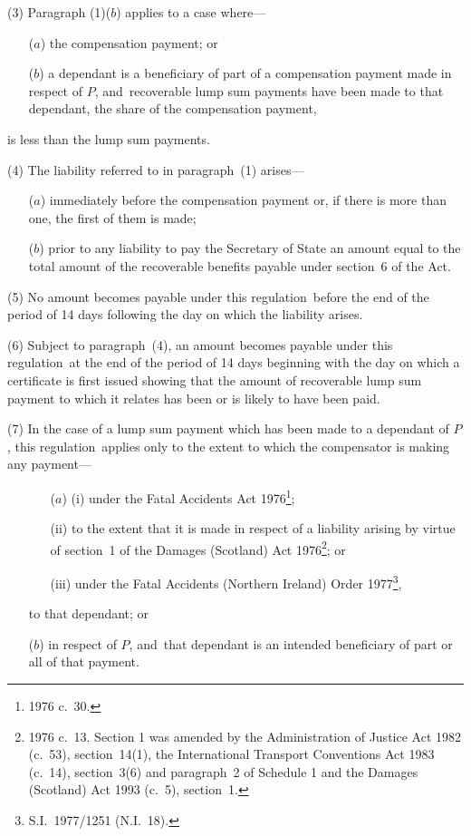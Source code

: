 \documentclass[12pt,a4paper]{article}
\begin{document}
(3) Paragraph (1)($b$)  applies to a case where—
\begin{enumerate}\item[]
($a$) the compensation payment; or

($b$) a dependant is a beneficiary of part of a compensation payment made in respect of $P$, and~recoverable lump sum payments have been made to that dependant, the share of the compensation payment,
\end{enumerate}
is less than the lump sum payments.

(4) The liability referred to in paragraph~(1) arises—
\begin{enumerate}\item[]
($a$) immediately before the compensation payment or, if there is more than one, the first of them is made;

($b$) prior to any liability to pay the Secretary of State an amount equal to the total amount of the recoverable benefits payable under section~6 of the Act.
\end{enumerate}

(5) No amount becomes payable under this regulation~before the end of the period of 14 days following the day on which the liability arises.

(6) Subject to paragraph~(4), an amount becomes payable under this regulation~at the end of the period of 14 days beginning with the day on which a certificate is first issued showing that the amount of recoverable lump sum payment to which it relates has been or is likely to have been paid.

(7) In the case of a lump sum payment which has been made to a dependant of $P$, this regulation~applies only to the extent to which the compensator is making any payment—
\begin{enumerate}\item[]
\begin{enumerate}
\item[($a$)] (i) under the Fatal Accidents Act 1976\footnote{1976 c.~30.};

(ii) to the extent that it is made in respect of a liability arising by virtue of section~1 of the Damages (Scotland) Act 1976\footnote{1976 c.~13. Section 1 was amended by the Administration of Justice Act 1982 (c.~53), section~14(1), the International Transport Conventions Act 1983 (c.~14), section~3(6) and paragraph~2 of Schedule 1 and the Damages (Scotland) Act 1993 (c.~5), section~1.}; or

(iii) under the Fatal Accidents (Northern Ireland) Order 1977\footnote{S.I.~1977/1251 (N.I.~18).},
\end{enumerate}
to that dependant; or

($b$) in respect of $P$, and~that dependant is an intended beneficiary of part or all of that payment.
\end{enumerate}
\end{document}
